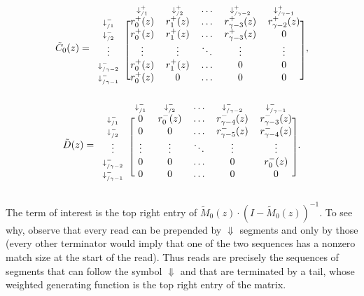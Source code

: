 \documentclass{article}
\begin{document}
\begin{equation*}
\tilde{C}_0(z) = 
\begin{blockarray}{cccccc}
   & \scriptstyle{\downarrow_{/1}^+} & \scriptstyle{\downarrow_{/2}^+} &
    \ldots & \scriptstyle{\downarrow_{/\gamma-2}^+} &
    \scriptstyle{\downarrow_{/\gamma-1}^+} \\
\begin{block}{c[ccccc]}
\scriptstyle{\downarrow_{/1}^-} & r_0^+(z) & r_1^+(z) & \ldots &
    r_{\gamma-3}^+(z) & r_{\gamma-2}^+(z) \\
\scriptstyle{\downarrow_{/2}^-} & r_0^+(z) & r_1^+(z) & \ldots &
    r_{\gamma-3}^+(z) & 0 \\
\vdots & \vdots & \vdots & \ddots & \vdots & \vdots \\
\scriptstyle{\downarrow_{/\gamma-2}^-} & r_0^+(z) & r_1^+(z) & \ldots &
    0 & 0 \\
\scriptstyle{\downarrow_{/\gamma-1}^-} & r_0^+(z) & 0 & \ldots & 0 & 0 \\
\end{block}
\end{blockarray},
\end{equation*}
\begin{equation*}
\tilde{D}(z) = 
\begin{blockarray}{cccccc}
   & \scriptstyle{\downarrow_{/1}^-} & \scriptstyle{\downarrow_{/2}^-} &
    \ldots & \scriptstyle{\downarrow_{/\gamma-2}^-} &
    \scriptstyle{\downarrow_{/\gamma-1}^-} \\
\begin{block}{c[ccccc]}
\scriptstyle{\downarrow_{/1}^-} & 0 & r_0^-(z) & \ldots &
    r_{\gamma-4}^-(z) & r_{\gamma-3}^-(z) \\
\scriptstyle{\downarrow_{/2}^-} & 0 & 0 & \ldots &
    r_{\gamma-5}^-(z) & r_{\gamma-4}^-(z) \\
\vdots & \vdots & \vdots & \ddots & \vdots & \vdots \\
\scriptstyle{\downarrow_{/\gamma-2}^-} & 0 & 0 & \ldots & 0 & r_0^-(z) \\
\scriptstyle{\downarrow_{/\gamma-1}^-} & 0 & 0 & \ldots & 0 & 0 \\
\end{block}
\end{blockarray}.
\end{equation*}

The term of interest is the top right entry of
$\tilde{M}_0(z)\cdot(I-\tilde{M}_0(z))^{-1}$. To see why, observe that
every read can be prepended by $\Downarrow$ segments and only by those
(every other terminator would imply that one of the two sequences has a
nonzero match size at the start of the read). Thus reads are precisely the
sequences of segments that can follow the symbol $\Downarrow$ and that are
terminated by a tail, whose weighted generating function is the top right
entry of the matrix.
\end{document}
